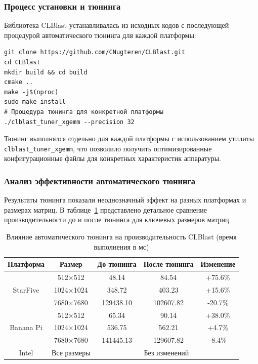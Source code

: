 \subsubsection{Процесс установки и тюнинга}

Библиотека CLBlast устанавливалась из исходных кодов с последующей процедурой автоматического тюнинга для каждой платформы:

\begin{verbatim}
git clone https://github.com/CNugteren/CLBlast.git
cd CLBlast
mkdir build && cd build
cmake ..
make -j$(nproc)
sudo make install
# Процедура тюнинга для конкретной платформы
./clblast_tuner_xgemm --precision 32
\end{verbatim}

Тюнинг выполнялся отдельно для каждой платформы с использованием утилиты \texttt{clblast\_tuner\_xgemm}, что позволило получить оптимизированные конфигурационные файлы для конкретных характеристик аппаратуры.

\subsubsection{Анализ эффективности автоматического тюнинга}

Результаты тюнинга показали неоднозначный эффект на разных платформах и размерах матриц. В таблице~\ref{tab:tuning_effect} представлено детальное сравнение производительности до и после тюнинга для ключевых размеров матриц.

\begin{table}[h!]
\centering
\caption{Влияние автоматического тюнинга на производительность CLBlast (время выполнения в мс)}
\label{tab:tuning_effect}
\begin{tabular}{|c|c|c|c|c|}
\hline
\textbf{Платформа} & \textbf{Размер} & \textbf{До тюнинга} & \textbf{После тюнинга} & \textbf{Изменение} \\
\hline
\multirow{3}{*}{StarFive} & 512×512 & 48.14 & 84.54 & +75.6\% \\
 & 1024×1024 & 348.72 & 403.23 & +15.6\% \\
 & 7680×7680 & 129438.10 & 102607.82 & -20.7\% \\
\hline
\multirow{3}{*}{Banana Pi} & 512×512 & 65.34 & 90.14 & +38.0\% \\
 & 1024×1024 & 536.75 & 562.21 & +4.7\% \\
 & 7680×7680 & 141445.13 & 129607.82 & -8.4\% \\
\hline
Intel & Все размеры & \multicolumn{3}{c|}{Без изменений} \\
\hline
\end{tabular}
\end{table}

